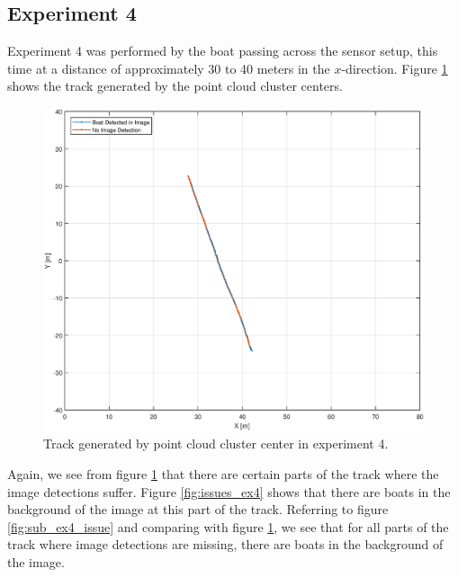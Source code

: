 \subsection{Experiment 4}
Experiment 4 was performed by the boat passing across the sensor setup, this time at a distance of approximately 30 to 40 meters in the $x$-direction. Figure \ref{fig:ex4_track} shows the track generated by the point cloud cluster centers.
\begin{figure}[H]
	\centering
	\includegraphics[width=.8\linewidth]{fig/exp_4_track.eps}
	\caption{Track generated by point cloud cluster center in experiment 4.}
	\label{fig:ex4_track}
\end{figure}
Again, we see from figure \ref{fig:ex4_track} that there are certain parts of the track where the image detections suffer. Figure \ref{fig:issues_ex4} shows that there are boats in the background of the image at this part of the track. Referring to figure \ref{fig:sub_ex4_issue} and comparing with figure \ref{fig:ex4_track}, we see that for all parts of the track where image detections are missing, there are boats in the background of the image.
